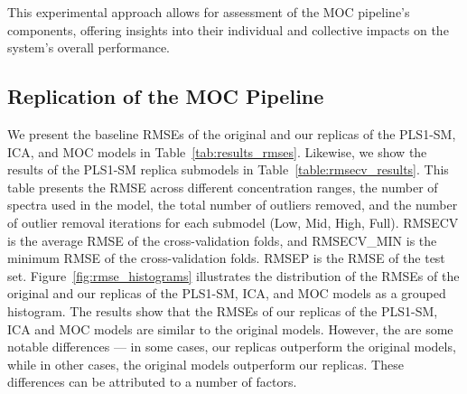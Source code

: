 This experimental approach allows for assessment of the MOC pipeline's components, offering insights into their individual and collective impacts on the system's overall performance.

\subsection{Replication of the MOC Pipeline}\label{sec:replica_moc}
We present the baseline RMSEs of the original and our replicas of the PLS1-SM, ICA, and MOC models in Table~\ref{tab:results_rmses}.
Likewise, we show the results of the PLS1-SM replica submodels in Table~\ref{table:rmsecv_results}. This table presents the RMSE across different concentration ranges, the number of spectra used in the model, the total number of outliers removed, and the number of outlier removal iterations for each submodel (Low, Mid, High, Full). RMSECV is the average RMSE of the cross-validation folds, and RMSECV\_MIN is the minimum RMSE of the cross-validation folds. RMSEP is the RMSE of the test set.
Figure~\ref{fig:rmse_histograms} illustrates the distribution of the RMSEs of the original and our replicas of the PLS1-SM, ICA, and MOC models as a grouped histogram.
The results show that the RMSEs of our replicas of the PLS1-SM, ICA and MOC models are similar to the original models.
However, the are some notable differences --- in some cases, our replicas outperform the original models, while in other cases, the original models outperform our replicas.
These differences can be attributed to a number of factors.

